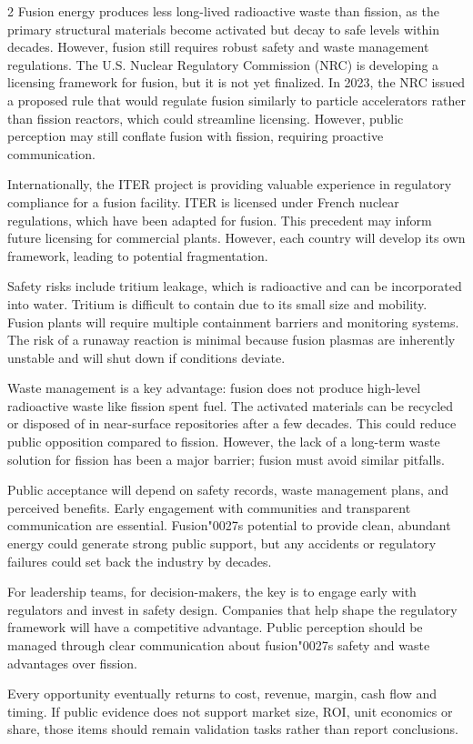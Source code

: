 \documentclass[10pt,a4paper]{article}
\newcommand{\BOApos}{{\BOQuoteFont\char"0027}}
\begin{document}
\begin{multicols}{2}
{\small Fusion energy produces less long-lived radioactive waste than fission, as the primary structural materials become activated but decay to safe levels within decades. However, fusion still requires robust safety and waste management regulations. The U.S. Nuclear Regulatory Commission (NRC) is developing a licensing framework for fusion, but it is not yet finalized. In 2023, the NRC issued a proposed rule that would regulate fusion similarly to particle accelerators rather than fission reactors, which could streamline licensing. However, public perception may still conflate fusion with fission, requiring proactive communication.}\par
{\small Internationally, the ITER project is providing valuable experience in regulatory compliance for a fusion facility. ITER is licensed under French nuclear regulations, which have been adapted for fusion. This precedent may inform future licensing for commercial plants. However, each country will develop its own framework, leading to potential fragmentation.}\par
{\small Safety risks include tritium leakage, which is radioactive and can be incorporated into water. Tritium is difficult to contain due to its small size and mobility. Fusion plants will require multiple containment barriers and monitoring systems. The risk of a runaway reaction is minimal because fusion plasmas are inherently unstable and will shut down if conditions deviate.}\par
{\small Waste management is a key advantage: fusion does not produce high-level radioactive waste like fission spent fuel. The activated materials can be recycled or disposed of in near-surface repositories after a few decades. This could reduce public opposition compared to fission. However, the lack of a long-term waste solution for fission has been a major barrier; fusion must avoid similar pitfalls.}\par
{\small Public acceptance will depend on safety records, waste management plans, and perceived benefits. Early engagement with communities and transparent communication are essential. Fusion\BOApos{}s potential to provide clean, abundant energy could generate strong public support, but any accidents or regulatory failures could set back the industry by decades.}\par
{\small For leadership teams, for decision-makers, the key is to engage early with regulators and invest in safety design. Companies that help shape the regulatory framework will have a competitive advantage. Public perception should be managed through clear communication about fusion\BOApos{}s safety and waste advantages over fission.}\par
{\small Every opportunity eventually returns to cost, revenue, margin, cash flow and timing. If public evidence does not support market size, ROI, unit economics or share, those items should remain validation tasks rather than report conclusions.}\par
\end{multicols}
\label{chap:3:end}
\end{document}
